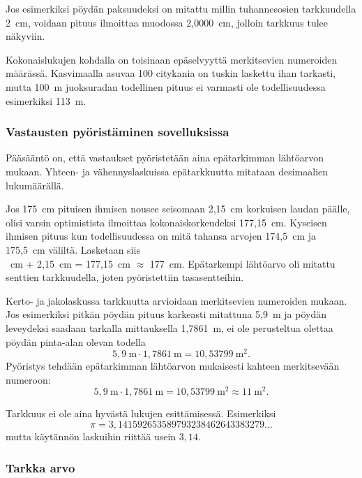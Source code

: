 Jos esimerkiksi pöydän paksuudeksi on mitattu millin tuhannesosien tarkkuudella 2~cm, voidaan pituus ilmoittaa muodossa 2,0000~cm, jolloin tarkkuus tulee näkyviin.


Kokonaislukujen kohdalla on toisinaan epäselvyyttä merkitsevien numeroiden määrässä. Kasvimaalla asuvaa 100 citykania on tuskin laskettu ihan tarkasti, mutta 100~m juoksuradan todellinen pituus ei varmasti ole todellisuudessa esimerkiksi 113~m.

\subsubsection*{Vastausten pyöristäminen sovelluksissa}

Pääsääntö on, että vastaukset pyöristetään aina epätarkimman lähtöarvon mukaan. Yhteen- ja vähennyslaskuissa epätarkkuutta mitataan desimaalien lukumäärällä.

\begin{esimerkki} Jos 175~cm pituisen ihmisen nousee seisomaan 2,15~cm korkuisen laudan päälle, olisi varsin optimistista ilmoittaa kokonaiskorkeudeksi 177,15~cm. Kyseisen ihmisen pituus kun todellisuudessa on mitä tahansa arvojen
174,5~cm ja 175,5~cm väliltä. Lasketaan siis\\
~cm + 2,15~cm = 177,15~cm $\approx$ 177~cm. 
Epätarkempi lähtöarvo oli mitattu senttien tarkkuudella, joten pyöristettiin tasasentteihin.
\end{esimerkki}

Kerto- ja jakolaskussa tarkkuutta arvioidaan merkitsevien numeroiden mukaan. Jos esimerkiksi pitkän pöydän pituus karkeasti mitattuna 5,9~m ja pöydän leveydeksi saadaan tarkalla mittauksella 1,7861~m, ei ole perusteltua olettaa pöydän pinta-alan olevan todella
\[ 5,9~\textrm{m} \cdot 1,7861~\textrm{m} = 10,53799~\textrm{m}^2. \] 
Pyöristys tehdään epätarkimman lähtöarvon mukaisesti kahteen merkitsevään numeroon:
\[ 5,9~\textrm{m} \cdot 1,7861~\textrm{m} = 10,53799~\textrm{m}^2 \approx 11~\textrm{m}^2.\] 

Tarkkuus ei ole aina hyvästä lukujen esittämisessä. Esimerkiksi
\[ \pi = 3,141592653589793238462643383279 \ldots \]
mutta käytännön laskuihin riittää usein $3,14$.


\subsubsection*{Tarkka arvo}

